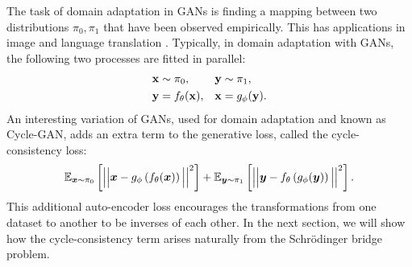 \documentclass[a4paper,12pt,twoside,openright]{report}
\theoremstyle{definition}
\begin{document}
The task of domain adaptation in GANs is finding a mapping between two distributions $\pi_0, \pi_1$ that have been observed empirically. This has applications in image and language translation \citep{zhu2017unpaired,lample2017unsupervised}. Typically, in domain adaptation with GANs, the following two processes are fitted in parallel:
\begin{align*}
    {\mathbf{x}} &\sim \pi_0,    &{\mathbf{y}} &\sim \pi_1,\\
    {\mathbf{y}} &= f_{\theta}({\mathbf{x}}),   &{\mathbf{x}} &= g_{\phi}({\mathbf{y}}).
\end{align*}
An interesting variation of GANs, used for domain adaptation and known as Cycle-GAN, adds an extra term to the generative loss, called the cycle-consistency loss:
\begin{align*}
   \mathbb{E}_{{\bm{x}} \sim \pi_0}\left[ \Big|\Big|{\bm{x}}- g_\phi\left(f_\theta({\bm{x}}) \right) \Big|\Big|^2\right] +  \mathbb{E}_{{\bm{y}} \sim \pi_1}\left[ \Big|\Big|{\bm{y}}- f_\theta\left(g_\phi({\bm{y}}) \right) \Big|\Big|^2\right].
\end{align*}
This additional auto-encoder loss encourages the transformations from one dataset to another to be inverses of each other. In the next section, we will show how the cycle-consistency term arises naturally from the Schrödinger bridge problem.
\end{document}

